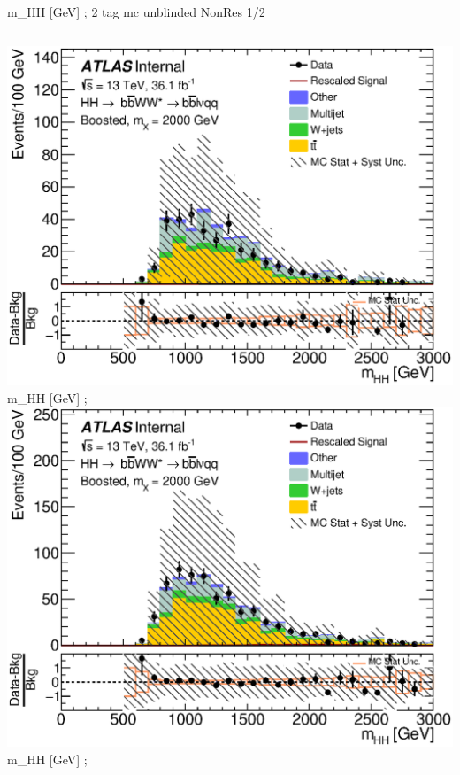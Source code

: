 \begin{frame}{m\_{HH} [GeV]  ; 2 tag mc unblinded NonRes 1/2}
\begin{columns}[c]
    \centering\includegraphics[width=\textwidth]{C_2tag_mbbcr_elec_presel_met50_hhMassRebin1}\\
    m\_{HH} [GeV]  ; 
    \centering\includegraphics[width=\textwidth]{C_2tag_mbbcr_lepton_presel_met50_hhMassRebin1}\\
    m\_{HH} [GeV]  ; 
  \end{columns}
\end{frame}


